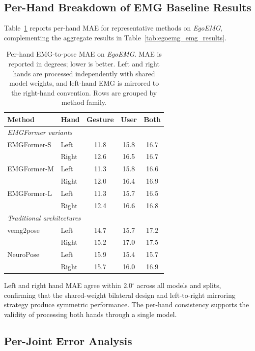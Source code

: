 \documentclass[letterpaper]{article} %
\newcommand{\dataset}{\textit{EgoEMG}}
\newcommand{\model}{EMGFormer}
\begin{document}
\subsection{Per-Hand Breakdown of EMG Baseline Results}
\label{app:emg_per_hand}
Table~\ref{tab:emg_per_hand} reports per-hand MAE for representative methods on \dataset{}, complementing the aggregate results in Table~\ref{tab:egoemg_emg_results}.

\begin{table}[t]
\centering
\caption{Per-hand EMG-to-pose MAE on \dataset{}. MAE is reported in degrees; lower is better. Left and right hands are processed independently with shared model weights, and left-hand EMG is mirrored to the right-hand convention. Rows are grouped by method family.}
\label{tab:emg_per_hand}
\footnotesize
\setlength{\tabcolsep}{3.8pt}
\renewcommand{\arraystretch}{1.08}
\begin{tabular}{llccc}
\toprule
Method & Hand & Gesture & User & Both \\
\midrule
\multicolumn{5}{l}{\textit{\model{} variants}} \\
\midrule
\model{}-S & Left & 11.8 & 15.8 & 16.7 \\
 & Right & 12.6 & 16.5 & 16.7 \\
\midrule
\model{}-M & Left & 11.3 & 15.8 & 16.6 \\
 & Right & 12.0 & 16.4 & 16.9 \\
\midrule
\model{}-L & Left & 11.3 & 15.7 & 16.5 \\
 & Right & 12.4 & 16.6 & 16.8 \\
\midrule
\multicolumn{5}{l}{\textit{Traditional architectures}} \\
\midrule
vemg2pose & Left & 14.7 & 15.7 & 17.2 \\
 & Right & 15.2 & 17.0 & 17.5 \\
\midrule
NeuroPose & Left & 15.9 & 15.4 & 15.7 \\
 & Right & 15.7 & 16.0 & 16.9 \\
\bottomrule
\end{tabular}

\end{table}

Left and right hand MAE agree within 2.0$^\circ$ across all models and splits, confirming that the shared-weight bilateral design and left-to-right mirroring strategy produce symmetric performance. The per-hand consistency supports the validity of processing both hands through a single model.

\subsection{Per-Joint Error Analysis}
\label{app:per_joint}
\end{document}
